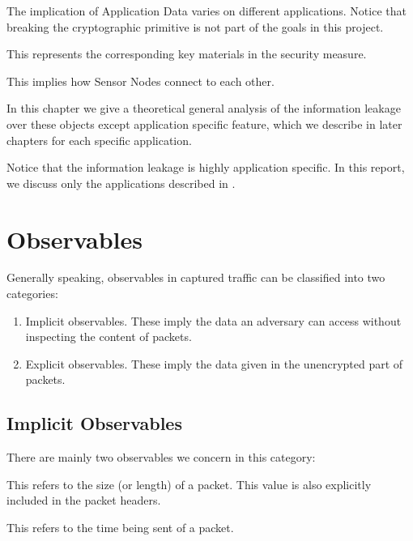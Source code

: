 \begin{description}[style=nextline]
	\item[Content and Size of Application Data]
	The implication of Application Data varies on different applications. Notice that breaking the cryptographic primitive is not part of the goals in this project.
	
	\item[Cryptographic Key]
	This represents the corresponding key materials in the security measure.
	
	\item[Network Topology]
	This implies how Sensor Nodes connect to each other.
	
	\item[Application Specific Feature]
\end{description}

In this chapter we give a theoretical general analysis of the information leakage over these objects except application specific feature, which we describe in later chapters for each specific application.

Notice that the information leakage is highly application specific. In this report, we discuss only the applications described in . 

\section{Observables} \label{Sec: Observables}

Generally speaking, observables in captured traffic can be classified into two categories:
\begin{enumerate}
	\item Implicit observables. These imply the data an adversary can access without inspecting the content of packets.
	\item Explicit observables. These imply the data given in the unencrypted part of packets.
\end{enumerate}

\subsection{Implicit Observables} \label{Subsec: Implicit Observables}

There are mainly two observables we concern in this category:

\begin{description}[style=nextline]
	\item[Packet Size] 
	This refers to the size (or length) of a packet. This value is also explicitly included in the packet headers.
	
	\item[Packet Timing]
	This refers to the time being sent of a packet. 
\end{description}

